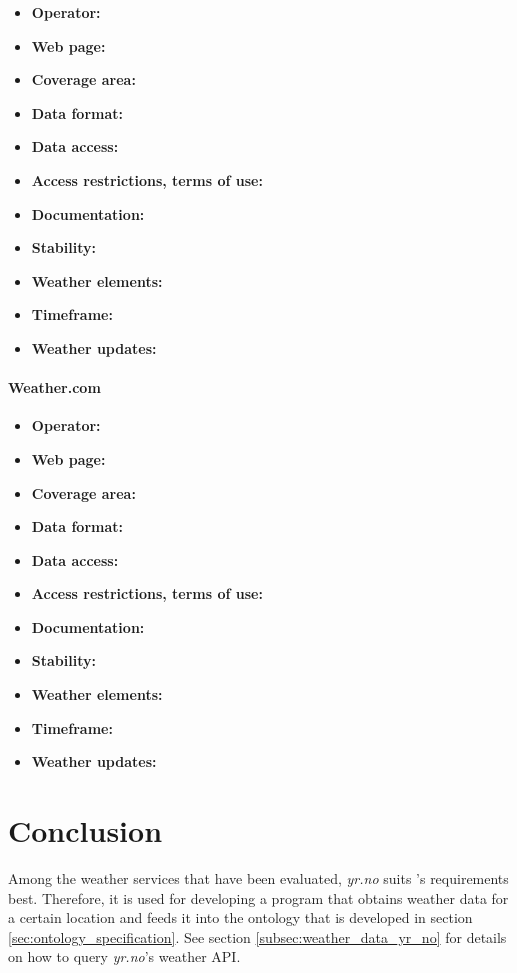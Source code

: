 \begin{itemize}
  \item \textbf{Operator:}
  \item \textbf{Web page:}
  \item \textbf{Coverage area:}
  \item \textbf{Data format:}
  \item \textbf{Data access:}
  \item \textbf{Access restrictions, terms of use:}
  \item \textbf{Documentation:}
  \item \textbf{Stability:}
  \item \textbf{Weather elements:}
  \item \textbf{Timeframe:}
  \item \textbf{Weather updates:}
\end{itemize}

\paragraph{Weather.com}

\begin{itemize}
  \item \textbf{Operator:}
  \item \textbf{Web page:}
  \item \textbf{Coverage area:}
  \item \textbf{Data format:}
  \item \textbf{Data access:}
  \item \textbf{Access restrictions, terms of use:}
  \item \textbf{Documentation:}
  \item \textbf{Stability:}
  \item \textbf{Weather elements:}
  \item \textbf{Timeframe:}
  \item \textbf{Weather updates:}
\end{itemize}

\section{Conclusion}
\label{sec:weather_conclusion}

Among the weather services that have been evaluated, \emph{yr.no} suits \thinkhome's requirements best. Therefore, it is used for developing a program that obtains weather data for a certain location and feeds it into the \thinkhomeweather ontology that is developed in section \ref{sec:ontology_specification}. See section \ref{subsec:weather_data_yr_no} for details on how to query \emph{yr.no}'s weather API.

